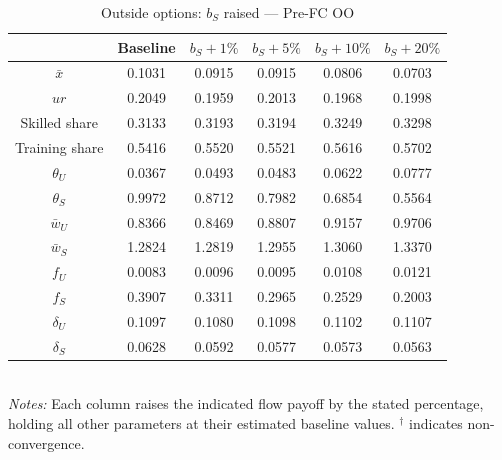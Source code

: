 \begin{table}[htbp]
\centering
\caption{Outside options: \(b_S\) raised — Pre-FC OO}
\label{tab:oo_bS_pre-fc_oo}
\small
\begin{tabular}{c c c c c c}
\toprule
  & Baseline & $b_S +1\%$ & $b_S +5\%$ & $b_S +10\%$ & $b_S +20\%$ \\
\midrule
\(\bar{x}\) & 0.1031 & 0.0915 & 0.0915 & 0.0806 & 0.0703 \\
\(ur\) & 0.2049 & 0.1959 & 0.2013 & 0.1968 & 0.1998 \\
Skilled share & 0.3133 & 0.3193 & 0.3194 & 0.3249 & 0.3298 \\
Training share & 0.5416 & 0.5520 & 0.5521 & 0.5616 & 0.5702 \\
\(\theta_U\) & 0.0367 & 0.0493 & 0.0483 & 0.0622 & 0.0777 \\
\(\theta_S\) & 0.9972 & 0.8712 & 0.7982 & 0.6854 & 0.5564 \\
\(\bar{w}_U\) & 0.8366 & 0.8469 & 0.8807 & 0.9157 & 0.9706 \\
\(\bar{w}_S\) & 1.2824 & 1.2819 & 1.2955 & 1.3060 & 1.3370 \\
\(f_U\) & 0.0083 & 0.0096 & 0.0095 & 0.0108 & 0.0121 \\
\(f_S\) & 0.3907 & 0.3311 & 0.2965 & 0.2529 & 0.2003 \\
\(\delta_U\) & 0.1097 & 0.1080 & 0.1098 & 0.1102 & 0.1107 \\
\(\delta_S\) & 0.0628 & 0.0592 & 0.0577 & 0.0573 & 0.0563 \\
\bottomrule
\end{tabular}
\\[2pt]
\footnotesize
\textit{Notes:} Each column raises the indicated flow payoff by the stated percentage, holding all other parameters at their estimated baseline values. \(^{\dagger}\) indicates non-convergence.
\end{table}
